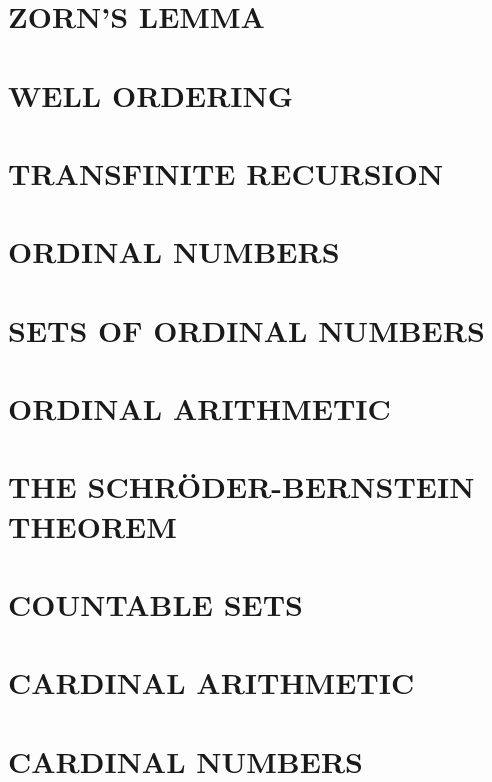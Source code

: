 \documentclass[fontsize=12pt,b5paper,
pagesize=auto]{book}
\theoremstyle{axiom}
\theoremstyle{exc}
\begin{document}
\chapter{ZORN'S LEMMA}


\chapter{WELL ORDERING}


\chapter{TRANSFINITE RECURSION} 


\chapter{ORDINAL NUMBERS}


\chapter{SETS OF ORDINAL NUMBERS}


\chapter{ORDINAL ARITHMETIC}


\chapter{THE SCHRÖDER-BERNSTEIN THEOREM}


\chapter{COUNTABLE SETS}


\chapter{CARDINAL ARITHMETIC}


\chapter{CARDINAL NUMBERS}

\end{document}
